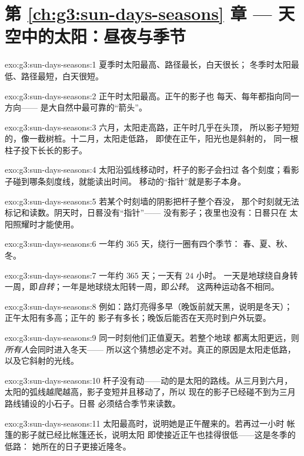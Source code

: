 \section*{第 \ref{ch:g3:sun-days-seasons} 章 --- 天空中的太阳：昼夜与季节}

\begin{solution}{exo:g3:sun-days-seasons:1}
夏季时太阳最高、路径最长，白天很长；
冬季时太阳最低、路径最短，白天很短。
\end{solution}

\begin{solution}{exo:g3:sun-days-seasons:2}
正午时太阳最高。正午的影子也
每天、每年都指向同一方向——
是大自然中最可靠的“箭头”。
\end{solution}

\begin{solution}{exo:g3:sun-days-seasons:3}
六月，太阳走高路，正午时几乎在头顶，
所以影子短短的，像一截树桩。十二月，太阳走低路，
即使在正午，阳光也是斜射的，
同一根柱子投下长长的影子。
\end{solution}

\begin{solution}{exo:g3:sun-days-seasons:4}
太阳沿弧线移动时，杆子的影子会扫过
各个刻度；看影子碰到哪条刻度线，就能读出时间。
移动的“指针”就是影子本身。
\end{solution}

\begin{solution}{exo:g3:sun-days-seasons:5}
若某个时刻墙的阴影把杆子整个吞没，
那个时刻就无法标记和读数。阴天时，日晷没有“指针”——
没有影子；夜里也没有：日晷只在
太阳照耀时才能使用。
\end{solution}

\begin{solution}{exo:g3:sun-days-seasons:6}
一年约 $365$ 天，绕行一圈有四个季节：
春、夏、秋、冬。
\end{solution}

\begin{solution}{exo:g3:sun-days-seasons:7}
一年约 $365$ 天；一天有 $24$ 小时。
一天是地球绕自身转一周，即\emph{自转}；一年是地球绕太阳转一周，即\emph{公转}。
这两种运动各不相同。
\end{solution}

\begin{solution}{exo:g3:sun-days-seasons:8}
例如：路灯亮得多早（晚饭前就天黑，说明是冬天）；
正午太阳有多高；正午的
影子有多长；晚饭后能否在天亮时到户外玩耍。
\end{solution}

\begin{solution}{exo:g3:sun-days-seasons:9}
同一时刻他们正值夏天。若整个地球
都离太阳更远，则\emph{所有人}会同时进入冬天——
所以这个猜想必定不对。真正的原因是太阳走低路，
以及它斜射的光线。
\end{solution}

\begin{solution}{exo:g3:sun-days-seasons:10}
杆子没有动——动的是太阳的路线。从三月到六月，
太阳的弧线越爬越高，影子变短并且移动了，所以
现在的影子已经碰不到为三月路线铺设的小石子。日晷
必须结合季节来读数。
\end{solution}

\begin{solution}{exo:g3:sun-days-seasons:11}
太阳最高时，说明她是正午醒来的。若再过一小时
帐篷的影子就已经比帐篷还长，说明太阳
即使接近正午也挂得很低——这是冬季的低路：
她所在的日子更接近隆冬。
\end{solution}
